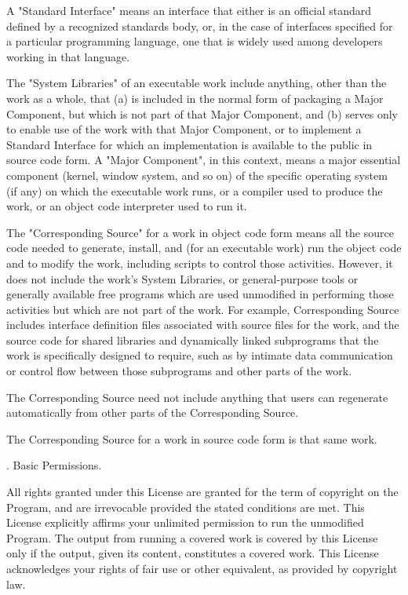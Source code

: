 A "Standard Interface" means an interface that either is an official
standard defined by a recognized standards body, or, in the case of
interfaces specified for a particular programming language, one that
is widely used among developers working in that language.

The "System Libraries" of an executable work include anything, other
than the work as a whole, that (a) is included in the normal form of
packaging a Major Component, but which is not part of that Major
Component, and (b) serves only to enable use of the work with that
Major Component, or to implement a Standard Interface for which an
implementation is available to the public in source code form.  A
"Major Component", in this context, means a major essential component
(kernel, window system, and so on) of the specific operating system
(if any) on which the executable work runs, or a compiler used to
produce the work, or an object code interpreter used to run it.

The "Corresponding Source" for a work in object code form means all
the source code needed to generate, install, and (for an executable
work) run the object code and to modify the work, including scripts to
control those activities.  However, it does not include the work's
System Libraries, or general-purpose tools or generally available free
programs which are used unmodified in performing those activities but
which are not part of the work.  For example, Corresponding Source
includes interface definition files associated with source files for
the work, and the source code for shared libraries and dynamically
linked subprograms that the work is specifically designed to require,
such as by intimate data communication or control flow between those
subprograms and other parts of the work.

The Corresponding Source need not include anything that users
can regenerate automatically from other parts of the Corresponding
Source.

The Corresponding Source for a work in source code form is that
same work.

. Basic Permissions.

All rights granted under this License are granted for the term of
copyright on the Program, and are irrevocable provided the stated
conditions are met.  This License explicitly affirms your unlimited
permission to run the unmodified Program.  The output from running a
covered work is covered by this License only if the output, given its
content, constitutes a covered work.  This License acknowledges your
rights of fair use or other equivalent, as provided by copyright law.

